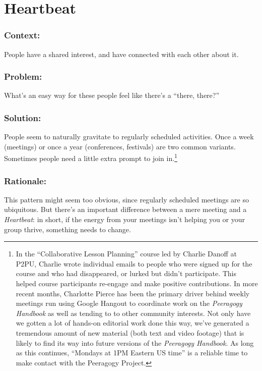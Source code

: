 \section{Heartbeat}

\subsubsection*{Context:}
People have a shared interest, and have connected with each other about it.

\subsubsection*{Problem:} What's an easy way for these people feel like there's a ``there, there?''

\subsubsection*{Solution:} People seem to naturally gravitate to regularly scheduled
activities. Once a week (meetings) or once a year (conferences, festivals) are two common variants.  Sometimes people need a little extra prompt to join in.\footnote{In the ``Collaborative Lesson Planning'' course led
by Charlie Danoff at P2PU, Charlie wrote individual emails to people who
were signed up for the course and who had disappeared, or lurked but
didn't participate. This helped course participants
re-engage and make positive contributions. In more recent
months, Charlotte Pierce has been the primary driver behind weekly meetings run using Google
Hangout to coordinate work on the \emph{Peeragogy Handbook} as well as tending to to other community interests. Not only have we
gotten a lot of hands-on editorial work done this way, we've generated a
tremendous amount of new material (both text and video footage) that is
likely to find its way into future versions of the \emph{Peeragogy Handbook}.  As long as this continues, ``Mondays at 1PM Eastern US time'' is a reliable time to make contact with the Peeragogy Project.}

\subsubsection*{Rationale:}  This pattern might seem too obvious, since regularly scheduled meetings are so ubiquitous.  But there's an important difference between a mere meeting and a \emph{Heartbeat}: in short, if the energy from your meetings isn't helping you or your group thrive, something needs to change.

